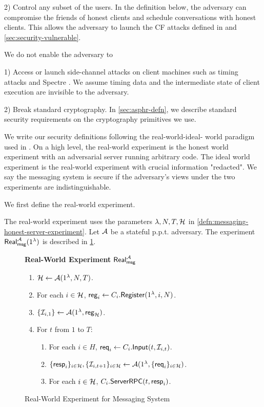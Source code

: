 2) Control any subset of the users. In the definition below, the adversary can compromise the friends of honest clients and schedule conversations with honest clients. This allows the adversary to launch the CF attacks defined in \cite{angel2018cf} and \cref{sec:security-vulnerable}.

We do not enable the adversary to

1) Access or launch side-channel attacks on client machines such as timing attacks and Spectre \cite{Spectre}. We assume timing data and the intermediate state of client execution are invisible to the adversary.

2) Break standard cryptography. In \cref{sec:asphr-defn}, we describe standard security requirements on the cryptography primitives we use.

We write our security definitions following the real-world-ideal- world paradigm used in \cite[Section 2.2]{shi2021non}. On a high level, the real-world experiment is the honest world experiment with an adversarial server running arbitrary code. The ideal world experiment is the real-world experiment with crucial information "redacted". We say the messaging system is secure if the adversary's views under the two experiments are indistinguishable.

We first define the real-world experiment.

\begin{definition}
\label{defn:messaging-real-world-experiment}
The real-world experiment uses the parameters $\lambda, N, T, \mathcal{H}$ in \cref{defn:messaging-honest-server-experiment}. Let $\mathcal{A}$ be a stateful p.p.t. adversary. The experiment $\mathsf{Real}_{\mathsf{msg}}^{\mathcal{A}}(1^{\lambda})$ is described in \cref{expr:messaging-real-world}.
\end{definition}

\begin{figure}[!ht]
\begin{framed}
\textbf{Real-World Experiment }$\mathsf{Real}_{\mathsf{msg}}^{\mathcal{A}}$
\begin{enumerate}
\item $\mathcal{H} \leftarrow \mathcal{A}(1^{\lambda}, N, T)$.
\item For each $i \in \mathcal{H}$, $\mathsf{reg}_i \leftarrow C_i.\mathsf{Register}(1^{\lambda}, i, N)$. 
\item $\{\mathcal{I}_{i, 1}\} \leftarrow \mathcal{A}(1^{\lambda}, \mathsf{reg}_{\mathcal{H}})$.
\item For $t$ from $1$ to $T$:
    \begin{enumerate}
    \item For each $i \in H$, $\mathsf{req}_i \leftarrow C_i.\mathsf{Input}(t, \mathcal{I}_{i, t})$.
    
    \item $\{\mathsf{resp}_i\}_{i \in \mathcal{H}}, \{\mathcal{I}_{i, t + 1}\}_{i \in \mathcal{H}} \leftarrow \mathcal{A}(1^{\lambda}, \{\mathsf{req}_i\}_{i \in \mathcal{H}})$.
    
    \item For each $i \in \mathcal{H}$, $C_i.\mathsf{ServerRPC}(t, \mathsf{resp}_i)$.
    \end{enumerate}
\end{enumerate}
\end{framed}
\caption{Real-World Experiment for Messaging System}
\label{expr:messaging-real-world}
\end{figure}

